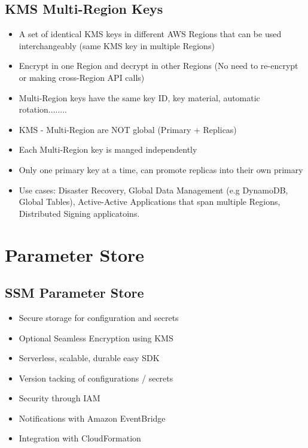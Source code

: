 
\subsection{KMS Multi-Region Keys}
\begin{itemize}
    \item A set of identical KMS keys in different AWS Regions that can be used interchangeably (same KMS key in multiple Regions)
    \item Encrypt in one Region and decrypt in other Regions (No need to re-encrypt or making cross-Region API calls)
    \item Multi-Region keys have the same key ID, key material, automatic rotation........
    \item KMS - Multi-Region are NOT global (Primary + Replicas)
    \item Each Multi-Region key is manged independently
    \item Only one primary key at a time, can promote replicas into their own primary
    \item Use cases: Disaster Recovery, Global Data Management (e.g DynamoDB, Global Tables), Active-Active Applications that span multiple Regions, Distributed Signing applicatoins.
\end{itemize}


\section{Parameter Store}

\subsection{SSM Parameter Store}
\begin{itemize}
    \item Secure storage for configuration and secrets
    \item Optional Seamless Encryption using KMS
    \item Serverless, scalable, durable easy SDK
    \item Version tacking of configurations / secrets
    \item Security through IAM
    \item Notifications with Amazon EventBridge
    \item Integration with CloudFormation
\end{itemize}

